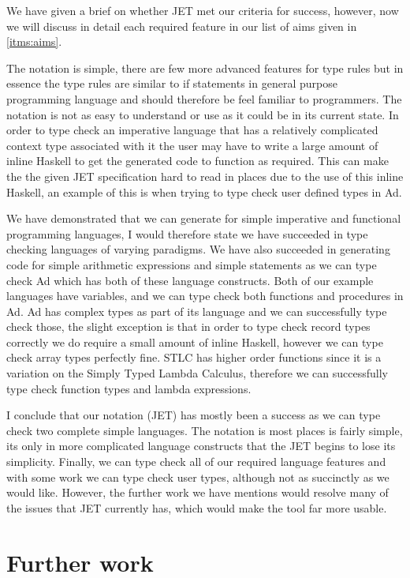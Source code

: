 We have given a brief on whether JET met our criteria for success, however, now we will discuss in detail each required feature in our list of aims given in \autoref{itms:aims}.

The notation is simple, there are few more advanced features for type rules but in essence the type rules are similar to if statements in general purpose programming language and should therefore be feel familiar to programmers.
The notation is not as easy to understand or use as it could be in its current state.
In order to type check an imperative language that has a relatively complicated context type associated with it the user may have to write a large amount of inline Haskell to get the generated code to function as required.
This can make the the given JET specification hard to read in places due to the use of this inline Haskell, an example of this is when trying to type check user defined types in Ad.

We have demonstrated that we can generate for simple imperative and functional programming languages, I would therefore state we have succeeded in type checking languages of varying paradigms.
We have also succeeded in generating code for simple arithmetic expressions and simple statements as we can type check Ad which has both of these language constructs.
Both of our example languages have variables, and we can type check both functions and procedures in Ad.
Ad has complex types as part of its language and we can successfully type check those, the slight exception is that in order to type check record types correctly we do require a small amount of inline Haskell, however we can type check array types perfectly fine.
STLC has higher order functions since it is a variation on the Simply Typed Lambda Calculus, therefore we can successfully type check function types and lambda expressions.

I conclude that our notation (JET) has mostly been a success as we can type check two complete simple languages. 
The notation is most places is fairly simple, its only in more complicated language constructs that the JET begins to lose its simplicity.
Finally, we can type check all of our required language features and with some work we can type check user types, although not as succinctly as we would like.
However, the further work we have mentions would resolve many of the issues that JET currently has, which would make the tool far more usable.

\section{Further work}

